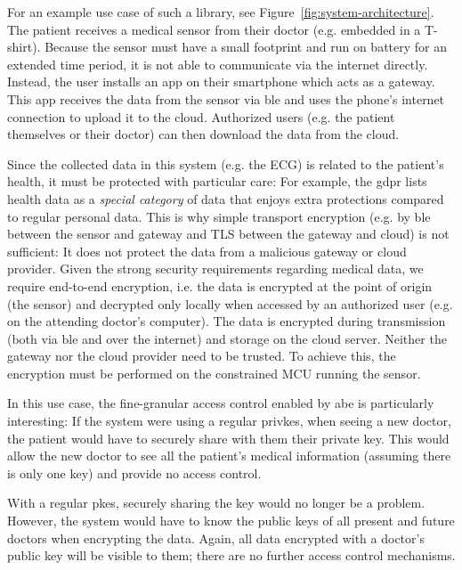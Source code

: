 For an example use case of such a library, see Figure~\ref{fig:system-architecture}.
The patient receives a medical sensor from their doctor (e.g. embedded in a T-shirt). 
Because the sensor must have a small footprint and run on battery for an extended time period, it is not able to communicate via the internet directly.
Instead, the user installs an app on their smartphone which acts as a gateway.
This app receives the data from the sensor via \acrfull{ble} and uses the phone's internet connection to upload it to the cloud.
Authorized users (e.g. the patient themselves or their doctor) can then download the data from the cloud.

Since the collected data in this system (e.g. the ECG) is related to the patient's health, it must be protected with particular care:
For example, the \acrshort{gdpr} lists health data as a \emph{special category} of data that enjoys extra protections compared to regular personal data. %
This is why simple transport encryption (e.g. by \acrshort{ble} between the sensor and gateway and TLS between the gateway and cloud) is not sufficient: It does not protect the data from a malicious gateway or cloud provider.
Given the strong security requirements regarding medical data, we require end-to-end encryption, i.e. the data is encrypted at the point of origin (the sensor) and decrypted only locally when accessed by an authorized user (e.g. on the attending doctor's computer).
The data is encrypted during transmission (both via \acrshort{ble} and over the internet) and storage on the cloud server.
Neither the gateway nor the cloud provider need to be trusted. 
To achieve this, the encryption must be performed on the constrained MCU running the sensor.

In this use case, the fine-granular access control enabled by \acrshort{abe} is particularly interesting:
If the system were using a regular \gls{privkes}, when seeing a new doctor, the patient would have to securely share with them their private key.
This would allow the new doctor to see all the patient's medical information (assuming there is only one key) and provide no access control.

With a regular \gls{pkes}, securely sharing the key would no longer be a problem. 
However, the system would have to know the public keys of all present and future doctors when encrypting the data. 
Again, all data encrypted with a doctor's public key will be visible to them; there are no further access control mechanisms.

